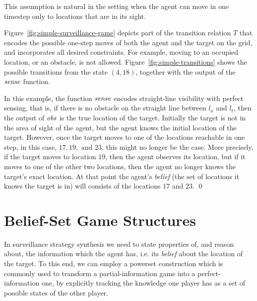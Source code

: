 This assumption is natural in the setting when the agent can move in one timestep only to locations that are in its sight.

\bigskip
\begin{eg}\label{ex:simple-surveillance-game}
Figure~\ref{fig:simple-surveillance-game} depicts part of the transition relation $T$ that encodes the possible one-step moves of both the agent and the target on the grid, and incorporates all desired constraints. For example, moving to an occupied location, or an obstacle, is not allowed. Figure~\ref{fig:simple-transitions} shows the possible transitions from the state $(4,18)$, together with the output of the $\mathit{sense}$ function.

In this example, the function $\mathit{sense}$ encodes straight-line visibility with perfect sensing, that is,  if there is no obstacle on the straight line between $l_a$ and $l_t$, then the output of $\mathit{obs}$ is the true location of the target. Initially the target is not in the area of sight of the agent, but the agent knows the initial location of the target. However, once the target moves to one of the locations reachable in one step, in this case, $17,19,\text{ and }23$, this might no longer be the case. More precisely, if the target moves to location $19$, then the agent observes its location, but if it moves to one of the other two locations, then the agent no longer knows the target's exact location. At that point the agent's \emph{belief} (the set of locations it knows the target is in) will consists of the locations $17$ and $23$.
\qed
\end{eg}



\section{Belief-Set Game Structures}

In surveillance strategy synthesis we need to state properties of, and reason about, the information which the agent has, i.e. its \emph{belief} about the location of the target. To this end, we can employ a powerset construction which is commonly used to transform a partial-information game into a perfect-information one, by explicitly tracking the knowledge one player has as a set of possible states of the other player.

\bigskip

